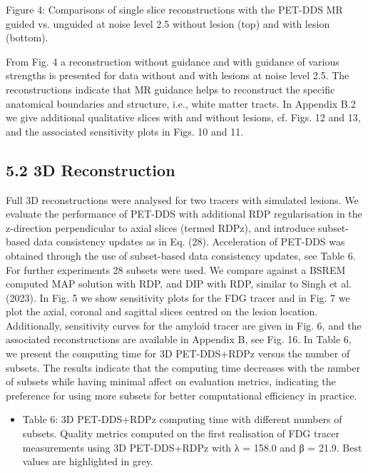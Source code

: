 \documentclass{article}
\begin{document}
Figure 4: Comparisons of single slice reconstructions with the PET-DDS MR guided vs. unguided at noise level 2.5 without lesion (top) and with lesion (bottom).

From Fig. 4 a reconstruction without guidance and with guidance of various strengths is presented for data without and with lesions at noise level 2.5. The reconstructions indicate that MR guidance helps to reconstruct the specific anatomical boundaries and structure, i.e., white matter tracts. In Appendix B.2 we give additional qualitative slices with and without lesions, cf. Figs. 12 and 13, and the associated sensitivity plots in Figs. 10 and 11.

\subsection{5.2 3D Reconstruction}

Full 3D reconstructions were analysed for two tracers with simulated lesions. We evaluate the performance of PET-DDS with additional RDP regularisation in the z-direction perpendicular to axial slices (termed RDPz), and introduce subset-based data consistency updates as in Eq. (28). Acceleration of PET-DDS was obtained through the use of subset-based data consistency updates, see Table 6. For further experiments 28 subsets were used. We compare against a BSREM computed MAP solution with RDP, and DIP with RDP, similar to Singh et al. (2023). In Fig. 5 we show sensitivity plots for the FDG tracer and in Fig. 7 we plot the axial, coronal and sagittal slices centred on the lesion location. Additionally, sensitivity curves for the amyloid tracer are given in Fig. 6, and the associated reconstructions are available in Appendix B, see Fig. 16. In Table 6, we present the computing time for 3D PET-DDS+RDPz versus the number of subsets. The results indicate that the computing time decreases with the number of subsets while having minimal affect on evaluation metrics, indicating the preference for using more subsets for better computational efficiency in practice.
\begin{itemize}
\item 
Table 6: 3D PET-DDS+RDPz computing time with different numbers of subsets. Quality metrics computed on the first realisation of FDG tracer measurements using 3D PET-DDS+RDPz with λ = 158.0 and β = 21.9. Best values are highlighted in grey.

\end{itemize}
\end{document}
